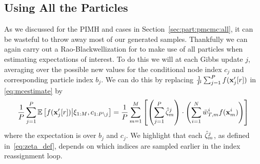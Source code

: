 


\subsection{Using All the Particles}
\label{sec:part:ipmcmc:allparticles}

As we discussed for the PIMH and \pg cases in Section~\ref{sec:part:pmcmc:all},
it can be wasteful to throw away most of our generated samples.  Thankfully we
can again carry out a Rao-Blackwellization for \ipmcmc to 
make use of all particles when estimating expectations of interest.  To do this
we will at each Gibbs update $j$, averaging over the possible new values for the 
conditional node index $c_j$ and corresponding particle index $b_j$. We can do this by replacing $\frac{1}{P}\sum_{j=1}^P f(\mathbf{x}_j'[r])$ 
in \eqref{eq:mcestimate} by
\begin{align*}
\frac{1}{P}\sum_{j=1}^P \mathbb{E}\left[f(\mathbf{x}_j'[r]) \middle| \xi_{1:M}, c_{1:P\backslash j} \right] 
=\frac{1}{P} \sum_{m=1}^M  \left[\left(\sum_{j=1}^P \hat \zeta_m^j \right) \cdot 
\left(\sum_{i=1}^N \bar w_{T,m}^i  f(\mathbf{x}_{m}^{i}) \right)\right]
\end{align*}
where the expectation is over $b_j$ and $c_j$.
We highlight that each $\hat{\zeta}_{m}^j$, as defined in~\eqref{eq:zeta_def}, 
depends on which indices are sampled earlier in the index reassignment loop.  

